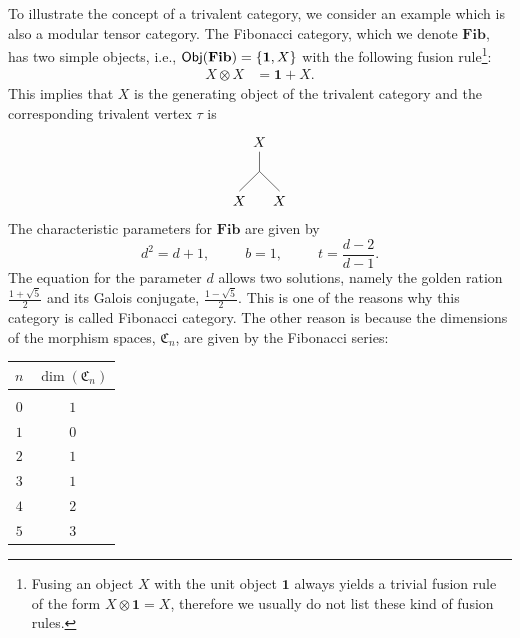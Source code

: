 \begin{exmp}
	\label{ex:TrivFib}
	To illustrate the concept of a trivalent category, we consider an example which is also a modular tensor category. The Fibonacci category, which we denote $\mathbf{Fib}$, has two simple objects, i.e., $\mathsf{Obj}(\mathbf{Fib})=\{\mathbf{1},X\}$ with the following fusion rule\footnote{Fusing an object $X$ with the unit object $\mathbf{1}$ always yields a trivial fusion rule of the form $X\otimes\mathbf{1}=X$, therefore we usually do not list these kind of fusion rules.}:
		\begin{align}
			X\otimes X&=\mathbf{1}+X.
		\end{align}
	This implies that $X$ is the generating object of the trivalent category and the corresponding trivalent vertex $\tau$ is
		\begin{equation}
			\begin{tikzpicture}[baseline=(current bounding box.center)]
				\draw (0,-0.5) -- (0,-1);
				\draw (0,-1) -- (-0.5,-1.5);
				\draw (0,-1) -- (0.5,-1.5);
				\node at (0,-0.5)[above] {$X$};
				\node at (0.5,-1.5)[below] {$X$};
				\node at (-0.5,-1.5)[below] {$X$};
			\end{tikzpicture}
		\end{equation}
	The characteristic parameters for $\mathbf{Fib}$ are given by
		\begin{equation}
			d^2=d+1,\hspace{30pt}b=1,\hspace{30pt}t=\frac{d-2}{d-1}.
		\end{equation}
	The equation for the parameter $d$ allows two solutions, namely the golden ration $\frac{1+\sqrt{5}}{2}$ and its Galois conjugate, $\frac{1-\sqrt{5}}{2}$. This is one of the reasons why this category is called Fibonacci category. The other reason is because the dimensions of the morphism spaces, $\mathfrak{C}_n$, are given by the Fibonacci series:
		\begin{table}[H]
			\centering
			\begin{tabular}{c|c}
				$n$ & $\dim(\mathfrak{C}_n)$\\ \hline \\[-0.3cm]
				$0$ & $1$\\
				$1$ & $0$\\
				$2$ & $1$\\
				$3$ & $1$\\
				$4$ & $2$\\
				$5$ & $3$\\

\end{tabular}
\end{table}
\end{exmp}
